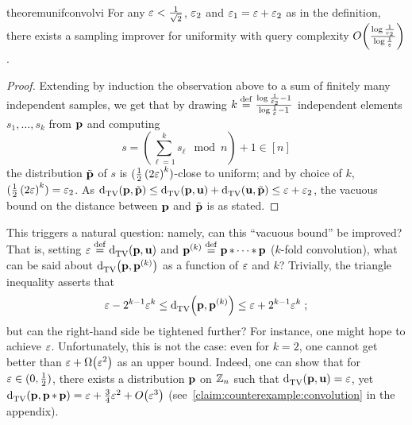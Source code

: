 \begin{restatable}{theorem}{unifconvolvi}\label{lemma:sampling:corrector:uniformity}
  For any $\varepsilon< \frac{1}{\sqrt{2}}$, $\varepsilon_2$ and $\varepsilon_1=\varepsilon+\varepsilon_2$ as in the definition, there exists a sampling improver for uniformity with query complexity $\bigO{\frac{\log\frac{1}{\eps_2}}{\log\frac{1}{\eps}}}$.
\end{restatable}
\begin{proof}
 Extending by induction the observation above to a sum of finitely many independent samples, we get that by drawing $k\stackrel{\rm def}{=}\frac{\log\frac{1}{\varepsilon_2}-1}{\log\frac{1}{\varepsilon}-1}$ independent elements $s_1,\dots,s_k$ from $\mathbf{p}$ and computing
  \[
  s=\left(\sum_{\ell=1}^k s_\ell \mod n\right) + 1 \in [n]
  \]
  the distribution $\tilde{\mathbf{p}}$ of $s$ is $(\frac{1}{2}\left( 2\varepsilon\right)^k)$-close to uniform; and by choice of $k$, $(\frac{1}{2}\left( 2\varepsilon\right)^k)=\varepsilon_2$.  As ${\operatorname{d}_{\textrm{TV}}^{}\!\left({ \mathbf{p} ,  \tilde{\mathbf{p}} }\right)} \leq {\operatorname{d}_{\textrm{TV}}^{}\!\left({ \ensuremath{\mathbf{p}},  \ensuremath{\mathbf{u}}}\right)} + {\operatorname{d}_{\textrm{TV}}^{}\!\left({ \mathbf{u} ,  \tilde{\mathbf{p}} }\right)} \leq \varepsilon+\varepsilon_2$, the vacuous bound on the distance between $\mathbf{p}$ and $\tilde{\mathbf{p}}$ is as stated.
\end{proof}

This triggers a natural question: namely, can this ``vacuous bound'' be improved? That is, setting $\varepsilon\stackrel{\rm def}{=}{\operatorname{d}_{\textrm{TV}}^{}\!\left({ \mathbf{p} ,  \mathbf{u} }\right)}$ and $\mathbf{p}^{(k)}\stackrel{\rm def}{=} \mathbf{p}\operatorname{\ast}\cdots\operatorname{\ast} \mathbf{p}$ ($k$-fold convolution), what can be said about ${\operatorname{d}_{\textrm{TV}}^{}\!\left({ \mathbf{p} ,  \mathbf{p}^{(k)} }\right)}$ as a function of $\varepsilon$ and $k$? Trivially, the triangle inequality asserts that
  \[
          \varepsilon - 2^{k-1}\varepsilon^k \leq {\operatorname{d}_{\textrm{TV}}^{}\!\left({ \ensuremath{\mathbf{p}},  \ensuremath{\mathbf{p}}^{(k)} }\right)} \leq \varepsilon + 2^{k-1}\varepsilon^k\;;
  \]
  but can  the right-hand side be tightened further? For instance, one might hope to achieve $\varepsilon$. Unfortunately, this is not the case: even for $k=2$, one cannot get better than $\eps + \bigOmega{\eps^2}$ as an upper bound. Indeed, one can show that for $\varepsilon\in(0,\frac12)$, there exists a distribution $\mathbf{p}$ on $\mathbb{Z}_n$ such that ${\operatorname{d}_{\textrm{TV}}^{}\!\left({ \mathbf{p} ,  \mathbf{u} }\right)} = \varepsilon$, yet $\totalvardist{ \D }{ \D\convolution \D } = \eps + \frac{3}{4}\eps^2 + \bigO{\eps^3}$ (see~\cref{claim:counterexample:convolution} in the appendix).

